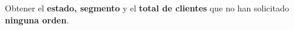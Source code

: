 Obtener el \textbf{estado, segmento} y el \textbf{total de clientes} que no han solicitado \textbf{ninguna orden}.